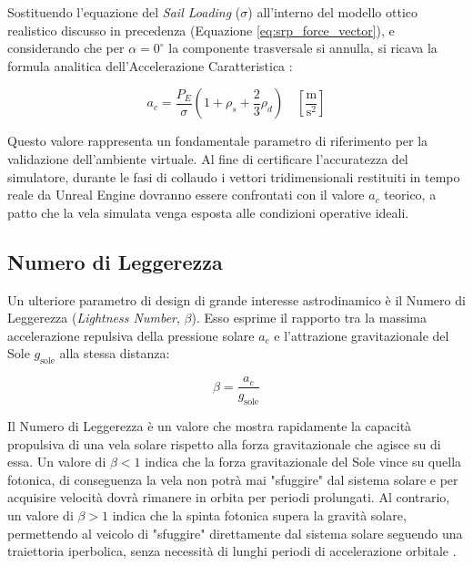 Sostituendo l'equazione del \textit{Sail Loading} ($\sigma$) all'interno del modello ottico realistico discusso in precedenza (Equazione \ref{eq:srp_force_vector}), e considerando che per $\alpha = 0^\circ$ la componente trasversale si annulla, si ricava la formula analitica dell'Accelerazione Caratteristica \cite{mcinnes1999solar}:

\begin{equation} \label{eq:accelerazione_caratteristica}
    a_c = \frac{P_E}{\sigma} \left( 1 + \rho_s + \frac{2}{3}\rho_d \right) \quad \left[ \frac{\text{m}}{\text{s}^2} \right]
\end{equation}

Questo valore rappresenta un fondamentale parametro di riferimento per la validazione dell'ambiente virtuale. Al fine di certificare l'accuratezza del simulatore, durante le fasi di collaudo i vettori tridimensionali restituiti in tempo reale da Unreal Engine dovranno essere confrontati con il valore $a_c$ teorico, a patto che la vela simulata venga esposta alle condizioni operative ideali.


\subsection{Numero di Leggerezza}
Un ulteriore parametro di design di grande interesse astrodinamico è il Numero di Leggerezza (\textit{Lightness Number}, $\beta$). Esso esprime il rapporto tra la massima accelerazione repulsiva della pressione solare $a_c$ e l'attrazione gravitazionale del Sole $g_{\text{sole}}$ alla stessa distanza:

\begin{equation}
    \beta = \frac{a_c}{g_{\text{sole}}}
\end{equation}

Il Numero di Leggerezza è un valore che mostra rapidamente la capacità propulsiva di una vela solare rispetto alla forza gravitazionale che agisce su di essa. Un valore di $\beta < 1$ indica che la forza gravitazionale del Sole vince su quella fotonica, di conseguenza la vela non potrà mai "sfuggire" dal sistema solare e per acquisire velocità dovrà rimanere in orbita per periodi prolungati. Al contrario, un valore di $\beta > 1$ indica che la spinta fotonica supera la gravità solare, permettendo al veicolo di "sfuggire" direttamente dal sistema solare seguendo una traiettoria iperbolica, senza necessità di lunghi periodi di accelerazione orbitale \cite{mcinnes1999solar}.

